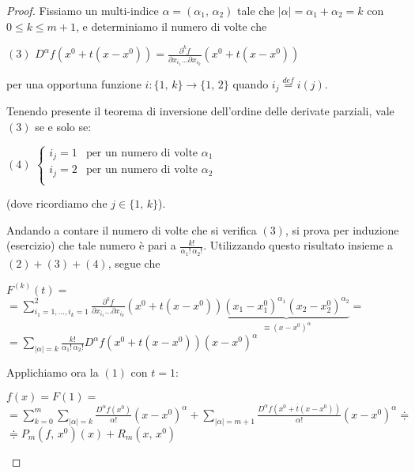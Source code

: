 \begin{proof}
Fissiamo un multi-indice $\alpha = (\alpha_1,\,\alpha_2)$ tale che $|\alpha| = \alpha_1+\alpha_2 = k$ con $0 \leq k \leq m+1$, e determiniamo il numero di volte che
\begin{center}
$\mathrm{(3)}$
\hfill
$\displaystyle D^{\alpha} f (x^0 + t(x-x^0)) = \frac{\partial^k f}{\partial x_{i_1} \ldots \partial x_{i_k}} (x^0 + t(x-x^0))$
\hfill \null \\
\end{center}
per una opportuna funzione $i : \lbrace 1,\,k \rbrace \longrightarrow \lbrace 1,\,2 \rbrace$ quando $i_j \overset{def}{=} i(j)$.

Tenendo presente il teorema di inversione dell'ordine delle derivate parziali, vale $\mathrm{(3)}$ se e solo se:
\begin{center}
$\mathrm{(4)}$
\hfill
$\displaystyle 
\begin{cases}
i_j = 1 & \text{per un numero di volte $\alpha_1$}\\
i_j = 2 & \text{per un numero di volte $\alpha_2$}\\
\end{cases}
$
\hfill \null \\
\end{center}
(dove ricordiamo che $j \in \lbrace 1,\,k \rbrace$).

Andando a contare il numero di volte che si verifica $\mathrm{(3)}$, si prova per induzione (esercizio) che tale numero è pari a $\displaystyle \frac{k!}{\alpha_1!\, \alpha_2!}$. Utilizzando questo risultato insieme a $(2)+(3)+(4)$, segue che
\begin{flushleft}
$\displaystyle F^{(k)}(t) =$\\
$\displaystyle = \sum_{i_1=1,\ldots,i_k=1}^2
\frac{\partial^k f}{\partial x_{i_1} \ldots \partial x_{i_k}}(x^0+t(x-x^0))
\underbrace{(x_1-x_1^0)^{\alpha_1} (x_2-x_2^0)^{\alpha_2}}_{\equiv (x-x^0)^{\alpha}}=$\\
$\displaystyle = \sum_{|\alpha|=k}
\frac{k!}{\alpha_1!\, \alpha_2!} D^{\alpha}f(x^0+t(x-x^0))
(x-x^0)^{\alpha}$
\end{flushleft}
Applichiamo ora la $\mathrm{(1)}$ con $t=1$:
\begin{flushleft}
$\displaystyle f(x) = F(1) =$\\
$\displaystyle = \sum_{k=0}^m \sum_{|\alpha|=k} \frac{D^{\alpha}f(x^0)}{\alpha!}(x-x^0)^{\alpha} + \sum_{|\alpha|=m+1} \frac{D^{\alpha}f(x^0+\overline{t}(x-x^0))}{\alpha!}(x-x^0)^{\alpha} \doteqdot $\\
$\displaystyle \doteqdot P_m(f,\,x^0)(x) + R_m(x,\,x^0)$
\end{flushleft}
\end{proof}

